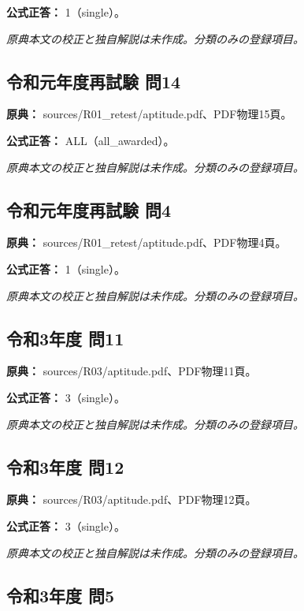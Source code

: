 \textbf{公式正答：} 1（single）。

\par\textit{原典本文の校正と独自解説は未作成。分類のみの登録項目。}

\subsection{令和元年度再試験 問14}
\label{q:r01-ret-apt-14}

\noindent\textbf{原典：} sources/R01\_retest/aptitude.pdf、PDF物理15頁。

\textbf{公式正答：} ALL（all\_awarded）。

\par\textit{原典本文の校正と独自解説は未作成。分類のみの登録項目。}

\subsection{令和元年度再試験 問4}
\label{q:r01-ret-apt-04}

\noindent\textbf{原典：} sources/R01\_retest/aptitude.pdf、PDF物理4頁。

\textbf{公式正答：} 1（single）。

\par\textit{原典本文の校正と独自解説は未作成。分類のみの登録項目。}

\subsection{令和3年度 問11}
\label{q:r03-reg-apt-11}

\noindent\textbf{原典：} sources/R03/aptitude.pdf、PDF物理11頁。

\textbf{公式正答：} 3（single）。

\par\textit{原典本文の校正と独自解説は未作成。分類のみの登録項目。}

\subsection{令和3年度 問12}
\label{q:r03-reg-apt-12}

\noindent\textbf{原典：} sources/R03/aptitude.pdf、PDF物理12頁。

\textbf{公式正答：} 3（single）。

\par\textit{原典本文の校正と独自解説は未作成。分類のみの登録項目。}

\subsection{令和3年度 問5}
\label{q:r03-reg-apt-05}

